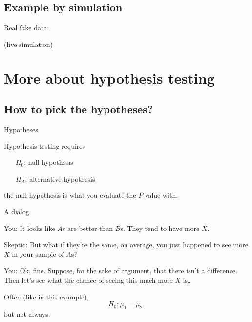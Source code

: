 \subsection{Example by simulation}

\begin{frame}{Real fake data:}
    
  \begin{center}
    (live simulation)
  \end{center}

\end{frame}



\section{More about hypothesis testing}

\subsection{How to pick the hypotheses?}

\begin{frame}{Hypotheses}

    Hypothesis testing requires 
    \begin{itemize}
        \item[$H_0$:] null hypothesis
        \item[$H_A$:] alternative hypothesis
    \end{itemize}

    \vspace{2em}

     the null hypothesis is what you evaluate the $P$-value with.


\end{frame}


\begin{frame}{A dialog}
    \begin{itemizew}{1em}
        \item[You:] It looks like $A$s are better than $B$s.  They tend to have more $X$.
        \item[Skeptic:] But what if they're the same, on average, you just happened to see more $X$ in your sample of $A$s?
        \item[You:] Ok, fine.  Suppose, for the sake of argument, that there \alert{isn't} a difference.
            Then let's see what the chance of seeing this much more $X$ is\ldots
    \end{itemizew}

    \vspace{2em}

    Often (like in this example), 
        \[ H_0: \mu_1 = \mu_2 , \]
    but not always.

\end{frame}


